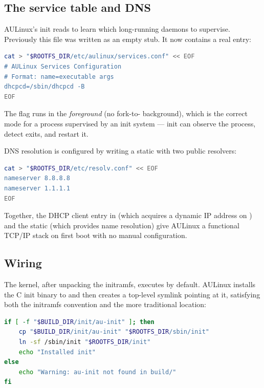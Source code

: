 \subsection{The  service table and DNS}

AULinux's init reads  to learn which
long-running daemons to supervise. Previously this file was written as an
empty stub. It now contains a real entry:

\begin{lstlisting}[language=bash, caption={make\_rootfs.sh --- writing services.conf with the DHCP client entry}]
cat > "$ROOTFS_DIR/etc/aulinux/services.conf" << EOF
# AULinux Services Configuration
# Format: name=executable args
dhcpcd=/sbin/dhcpcd -B
EOF
\end{lstlisting}

The  flag runs  in the \emph{foreground} (no fork-to-
background), which is the correct mode for a process supervised by an init
system --- init can observe the process, detect exits, and restart it.

DNS resolution is configured by writing a static  with
two public resolvers:

\begin{lstlisting}[language=bash, caption={make\_rootfs.sh --- configuring public DNS via resolv.conf}]
cat > "$ROOTFS_DIR/etc/resolv.conf" << EOF
nameserver 8.8.8.8
nameserver 1.1.1.1
EOF
\end{lstlisting}

Together, the DHCP client entry in  (which acquires a
dynamic IP address on ) and the static  (which
provides name resolution) give AULinux a functional TCP/IP stack on first boot
with no manual configuration.

\subsection{Wiring }

The kernel, after unpacking the initramfs, executes  by default.
AULinux installs the C init binary to  and then creates a
top-level  symlink pointing at it, satisfying both the initramfs
convention and the more traditional  location:

\begin{lstlisting}[language=bash, caption={make\_rootfs.sh --- installing init and the /init entry point}]
if [ -f "$BUILD_DIR/init/au-init" ]; then
    cp "$BUILD_DIR/init/au-init" "$ROOTFS_DIR/sbin/init"
    ln -sf /sbin/init "$ROOTFS_DIR/init"
    echo "Installed init"
else
    echo "Warning: au-init not found in build/"
fi
\end{lstlisting}

